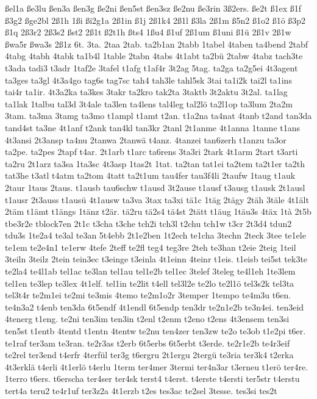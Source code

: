 {ßel1a
ße3lu
ßen3a
ßen3g
ße2ni
ßen5st
ßen3sz
ße2nu
ße3rin
3ß2ers.
ße2t
ß1ex
ß1f
ß3g2
ßge2bl
2ß1h
1ßi
ßi2g1a
2ß1in
ß1j
2ß1k4
2ß1l
ß3la
2ß1m
ß5n2
ß1o2
ß1ö
ß3p2
ß1q
2ß3r2
2ß3s2
ßst2
2ß1t
ß2t1h
ßts4
1ßu4
ß1uf
2ß1um
ß1uni
ß1ü
2ß1v
2ß1w
ßwa5r
ßwa3s
2ß1z
6t.
3ta.
2taa
2tab.
ta2b1an
2tabb
1tabel
4taben
ta4bend
2tabf
4tabg
4tabh
4tabk
ta1b4l
1table
2tabn
4tabs
4t1abt
ta2bü
2tabw
4tabz
tach3te
t3ada
tadi3
t3adr
1taf2e
3tafel
t1afg
t1af4r
3t2ag
5tag.
ta2ga
ta2g5ei
4t3agent
ta3ges
ta3gl
4t3a4go
tag6s
tag7sc
tah4
tah3le
tahl5sk
3tai
ta1i2k
tai2l
ta1ins
tai4r
ta1ir.
4t3a2ka
ta3kes
3takr
ta2kro
tak2ta
3taktb
3t2aktu
3t2al.
ta1lag
ta1lak
1talbu
tal3d
3t4ale
ta3len
ta4lens
tal4leg
tal2lö
ta2l1op
ta3lum
2ta2m
3tam.
ta3ma
3tamg
ta3mo
t1ampl
t1amt
t2an.
t1a2na
ta4nat
4tanb
t2and
tan3da
tand4st
ta3ne
4t1anf
t2ank
tan4kl
tan3kr
2tanl
2t1anme
4t1anna
1tanne
t1ans
4t3ansi
2t3ansp
ta4nu
2tanwa
2tanwä
t4anz.
4tanzei
tan6zerh
t1anzu
ta3or
ta2pe.
ta2pes
2tapf
t4ar.
2t1arb
t1arc
ta6rens
3ta3ri
2tark
4t1arm
2tart
t3arti
ta2ru
2t1arz
ta3sa
1ta3sc
4t3asp
1tas2t
1tat.
ta2tan
tat1ei
ta2tem
ta2t1er
ta2th
tat3he
t3atl
t4atm
ta2tom
4tatt
ta2t1um
tau4fer
tau3f4li
2taufw
1taug
t1auk
2taur
1taus
2taus.
t1ausb
tau6schw
t1ausd
3t2ause
t1ausf
t3ausg
t1ausk
2t1ausl
t1ausr
2t3auss
t1ausü
4t1ausw
ta3va
3tax
ta3xi
tä1c
1täg
2tägy
2täh
3täle
4t1ält
2täm
t1ämt
t1ängs
1tänz
t2är.
tä2ru
tä2s4
tä4st
2tätt
t1äug
1täu3s
4täx
1tà
2t5b
tbe3r2e
tblock7en
2t1c
t3cha
t3che
tch2i
tch3l
t2chu
tch1w
t3cr
2t3d4
tdun2
tdu3s
1te2a4
te3al
te3an
5t4ebb
2t1e2ben
1t2ech
te1cha
3techn
2teck
3tee
te1ele
te1em
te2e4n1
te1erw
4tefe
2teff
te2fl
teg4
teg3re
2teh
te3han
t2eie
2teig
1teil
3teiln
3teilz
2tein
tein3ec
t3einge
t3einla
4t1einn
4teinr
t1eis.
t1eisb
tei5st
tek3te
te2la4
te4l1ab
tel1ac
te3lan
tel1au
tel1e2b
tel1ec
3telef
3teleg
te4l1eh
1te3lem
tel1en
te3lep
te3lex
4t1elf.
tel1in
te2lit
t4ell
tel3l2e
te2lo
te2l1ö
tel3s2k
tel3ta
tel3t4r
te2m1ei
te2mi
te3mis
4temo
te2m1o2r
3temper
1tempo
te4m3u
t6en.
te4n3a2
t4enb
ten3da
6t5endf
4t1endl
6t5endp
ten3dr
te2n1e2b
te3n4ei.
ten3eid
4tenerg
t1eng.
te2ni
ten3im
ten3in
t2enl
t2enm
t2eno
t2ens
4t3ensem
ten3si
ten5st
t1entb
4tentd
t1entn
4tentw
te2nu
ten4zer
ten3zw
te2o
te3ob
t1e2pi
t6er.
te1raf
ter3am
te3ran.
te2r3as
t2erb
6t5erbs
6t5erbt
t3erde.
te2r1e2b
te4r3eif
te2rel
ter3end
t4erfr
4terfül
ter3g
t6ergru
2t1ergu
2tergü
te3ria
ter3k4
t2erka
4t3erklä
t4erli
4t1erlö
t4erlu
1term
ter4mer
3termi
ter4n3ar
t3erneu
t1erö
ter4re.
1terro
t6ers.
t6erscha
ter4ser
ter4sk
terst4
t4erst.
t4erste
t4ersti
ter5str
t4erstu
tert4a
teru2
te4r1uf
ter3z2a
4t1erzb
t2es
tes3ac
te2sel
3tesse.
tes3si
tes2t
}
